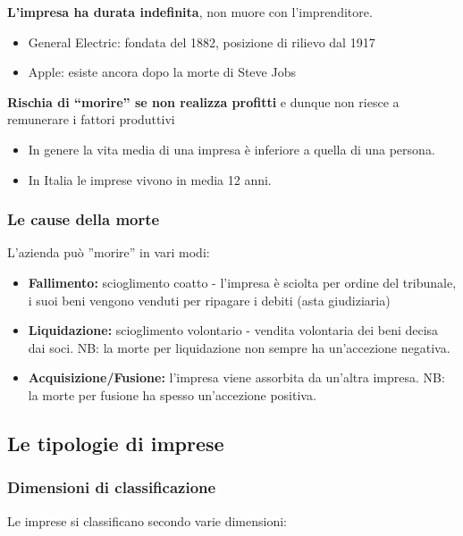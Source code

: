 \documentclass[../main.tex]{subfiles}
\begin{document}
\textbf{L'impresa ha durata indefinita}, non muore con l'imprenditore.

\begin{itemize}
\item General Electric: fondata del 1882, posizione di rilievo dal 1917
\item Apple: esiste ancora dopo la morte di Steve Jobs
\end{itemize}

\textbf{Rischia di ``morire'' se non realizza profitti} e dunque non riesce a remunerare i fattori produttivi
\begin{itemize}
\item In genere la vita media di una impresa è inferiore a quella di una persona.
\item In Italia le imprese vivono in media 12 anni.
\end{itemize}

\subsubsection{Le cause della morte}

L'azienda può ''morire''  in vari modi:

\begin{itemize}
\item \textbf{Fallimento:} scioglimento coatto - l'impresa è sciolta per ordine del tribunale, i suoi beni vengono venduti per ripagare i debiti (asta giudiziaria)
\item \textbf{Liquidazione:} scioglimento volontario - vendita volontaria dei beni decisa dai soci. NB: la morte per liquidazione non sempre ha un'accezione negativa.
\item \textbf{Acquisizione/Fusione:} l'impresa viene assorbita da un'altra impresa. NB: la morte per fusione ha spesso un'accezione positiva.
\end{itemize}

\subsection{Le tipologie di imprese}

\subsubsection{Dimensioni di classificazione}

Le imprese si classificano secondo varie dimensioni:
\end{document}
